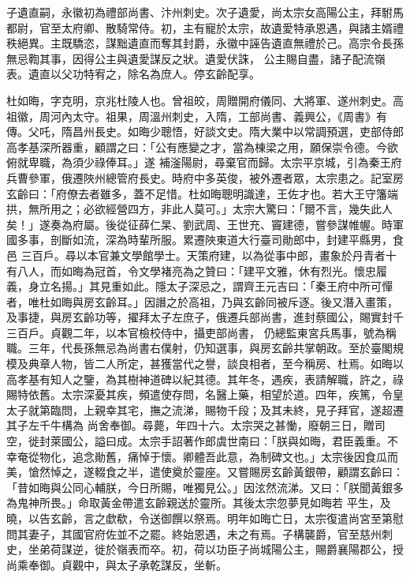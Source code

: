 \begin{pinyinscope}
 子遺直嗣，永徽初為禮部尚書、汴州刺史。次子遺愛，尚太宗女高陽公主，拜駙馬都尉，官至太府卿、散騎常侍。初，主有寵於太宗，故遺愛特承恩遇，與諸主婿禮秩絕異。主既驕恣，謀黜遺直而奪其封爵，永徽中誣告遺直無禮於己。高宗令長孫無忌鞫其事，因得公主與遺愛謀反之狀。遺愛伏誅，
 公主賜自盡，諸子配流嶺表。遺直以父功特宥之，除名為庶人。停玄齡配享。



 杜如晦，字克明，京兆杜陵人也。曾祖皎，周贈開府儀同、大將軍、遂州刺史。高祖徽，周河內太守。祖果，周溫州刺史，入隋，工部尚書、義興公，《周書》有傳。父吒，隋昌州長史。如晦少聰悟，好談文史。隋大業中以常調預選，吏部侍郎高孝基深所器重，顧謂之曰：「公有應變之才，當為棟梁之用，願保崇令德。今欲俯就卑職，為須少祿俸耳。」遂
 補滏陽尉，尋棄官而歸。太宗平京城，引為秦王府兵曹參軍，俄遷陜州總管府長史。時府中多英俊，被外遷者眾，太宗患之。記室房玄齡曰：「府僚去者雖多，蓋不足惜。杜如晦聰明識達，王佐才也。若大王守籓端拱，無所用之；必欲經營四方，非此人莫可。」太宗大驚曰：「爾不言，幾失此人矣！」遂奏為府屬。後從征薛仁杲、劉武周、王世充、竇建德，嘗參謀帷幄。時軍國多事，剖斷如流，深為時輩所服。累遷陜東道大行臺司勛郎中，封建平縣男，食邑
 三百戶。尋以本官兼文學館學士。天策府建，以為從事中郎，畫象於丹青者十有八人，而如晦為冠首，令文學褚亮為之贊曰：「建平文雅，休有烈光。懷忠履義，身立名揚。」其見重如此。隱太子深忌之，謂齊王元吉曰：「秦王府中所可憚者，唯杜如晦與房玄齡耳。」因譖之於高祖，乃與玄齡同被斥逐。後又潛入畫策，及事捷，與房玄齡功等，擢拜太子左庶子，俄遷兵部尚書，進封蔡國公，賜實封千三百戶。貞觀二年，以本官檢校侍中，攝吏部尚書，
 仍總監東宮兵馬事，號為稱職。三年，代長孫無忌為尚書右僕射，仍知選事，與房玄齡共掌朝政。至於臺閣規模及典章人物，皆二人所定，甚獲當代之譽，談良相者，至今稱房、杜焉。如晦以高孝基有知人之鑒，為其樹神道碑以紀其德。其年冬，遇疾，表請解職，許之，祿賜特依舊。太宗深憂其疾，頻遣使存問，名醫上藥，相望於道。四年，疾篤，令皇太子就第臨問，上親幸其宅，撫之流涕，賜物千段；及其未終，見子拜官，遂超遷其子左千牛構為
 尚舍奉御。尋薨，年四十六。太宗哭之甚慟，廢朝三日，贈司空，徙封萊國公，謚曰成。太宗手詔著作郎虞世南曰：「朕與如晦，君臣義重。不幸奄從物化，追念勛舊，痛悼于懷。卿體吾此意，為制碑文也。」太宗後因食瓜而美，愴然悼之，遂輟食之半，遣使奠於靈座。又嘗賜房玄齡黃銀帶，顧謂玄齡曰：「昔如晦與公同心輔朕，今日所賜，唯獨見公。」因泫然流涕。又曰：「朕聞黃銀多為鬼神所畏。」命取黃金帶遣玄齡親送於靈所。其後太宗忽夢見如晦若
 平生，及曉，以告玄齡，言之歔欷，令送御饌以祭焉。明年如晦亡日，太宗復遣尚宮至第慰問其妻子，其國官府佐並不之罷。終始恩遇，未之有焉。子構襲爵，官至慈州刺史，坐弟荷謀逆，徙於嶺表而卒。初，荷以功臣子尚城陽公主，賜爵襄陽郡公，授尚乘奉御。貞觀中，與太子承乾謀反，坐斬。




\end{pinyinscope}
